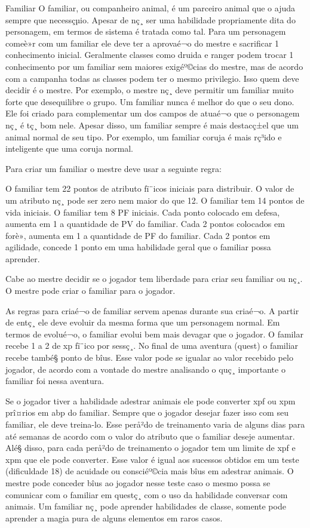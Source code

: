 Familiar
O familiar, ou companheiro animal, é um parceiro animal que o ajuda sempre que necessçµio. Apesar de nç¸ ser uma habilidade propriamente dita do personagem, em termos de sistema é tratada como tal. Para um personagem comeè»r com um familiar ele deve ter a aprovaé¬o do mestre e sacrificar 1 conhecimento inicial. Geralmente classes como druida e ranger podem trocar 1 conhecimento por um familiar sem maiores exigéº©cias do mestre, mas de acordo com a campanha todas as classes podem ter o mesmo privilegio. Isso quem deve decidir é o mestre. Por exemplo, o mestre nç¸ deve permitir um familiar muito forte que desequilibre o grupo. Um familiar nunca é melhor do que o seu dono. Ele foi criado para complementar um dos campos de atuaé¬o que o personagem nç¸ é tç¸ bom nele. Apesar disso, um familiar sempre é mais destacç±el que um animal normal de seu tipo. Por exemplo, um familiar coruja é mais rç³ido e inteligente que uma coruja normal.

Para criar um familiar o mestre deve usar a seguinte regra:

	 O familiar tem 22 pontos de atributo fï¨icos iniciais para distribuir.
	 O valor de um atributo nç¸ pode ser zero nem maior do que 12.
	 O familiar tem 14 pontos de vida iniciais.
	 O familiar tem 8 PF iniciais.
	 Cada ponto colocado em defesa, aumenta em 1 a quantidade de PV do familiar.
	 Cada 2 pontos colocados em forè», aumenta em 1 a quantidade de PF do familiar.
	 Cada 2 pontos em agilidade, concede 1 ponto em uma habilidade geral que o familiar possa aprender.


Cabe ao mestre decidir se o jogador tem liberdade para criar seu familiar ou nç¸. O mestre pode criar o familiar para o jogador.

As regras para criaé¬o de familiar servem apenas durante sua criaé¬o. A partir de entç¸ ele deve evoluir da mesma forma que um personagem normal. Em termos de evolué¬o, o familiar evolui bem mais devagar que o jogador. O familar recebe 1 a 2 de xp fï¨ico por sessç¸. No final de uma aventura (quest) o familiar recebe també§ ponto de bîus. Esse valor pode se igualar ao valor recebido pelo jogador, de acordo com a vontade do mestre analisando o quç¸ importante o familiar foi nessa aventura. 

Se o jogador tiver a habilidade adestrar animais ele pode converter xpf ou xpm prî¤rios em abp do familiar. Sempre que o jogador desejar fazer isso com seu familiar, ele deve treina-lo. Esse perå²do de treinamento varia de alguns dias para até semanas de acordo com o valor do atributo que o familiar deseje aumentar. Alé§ disso, para cada perå²do de treinamento o jogador tem um limite de xpf e xpm que ele pode converter. Esse valor é igual aos sucessos obtidos em um teste (dificuldade 18) de acuidade ou consciéº©cia mais bîus em adestrar animais. O mestre pode conceder bîus ao jogador nesse teste caso o mesmo possa se comunicar com o familiar em questç¸ com o uso da habilidade conversar com animais. Um familiar nç¸ pode aprender habilidades de classe, somente pode aprender a magia pura de alguns elementos em raros casos.


